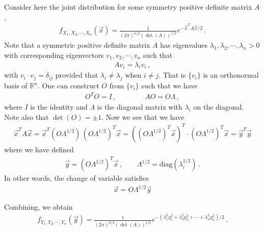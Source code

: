 \documentclass[11pt, onesided]{book}
\theoremstyle{break}
\theoremstyle{break}
\newcommand{\R}{\mathbb{R}}
\begin{document}
Consider here the joint distribution for some symmetry positive definite matrix $A$,
\begin{align*}
f_{X_1,X_2,\cdots, X_n}(\vec{x}) = \frac{1}{(2\pi)^{n/2} (\det(A))^{1/2}} e^{-\vec{x}^T A\vec{x}/2}\,.
\end{align*}
Note that a symmetric positive definite matrix $A$ has eigenvalues $\lambda_1,\lambda_2,\cdots, \lambda_n > 0$ with corresponding eigenvectors $v_1,v_2,\cdots, v_n$ such that 
\begin{align*}
A v_i = \lambda_i v_i\,,
\end{align*}
with $v_i \cdot v_j = \delta_{ij}$ provided that $\lambda_i \neq \lambda_j$ when $i \neq j$. That is $\{v_i\}$ is an orthonormal basis of $\R^n$. One can construct $O$ from $\{v_i\}$ such that we have
\begin{align*}
O^TO = I\,,\qquad \qquad AO = O\Lambda\,,
\end{align*}
where $I$ is the identity and $\Lambda$ is the diagonal matrix with $\lambda_i$ on the diagonal. Note also that $\det(O) = \pm 1$. Now we see that we have
\begin{align*}
\vec{x}^T A \vec{x} = \vec{x}^T\left( O \Lambda^{1/2}\right)\, \left( O \Lambda^{1/2}\right)^T \vec{x} = \left( (O \Lambda^{1/2})^T \vec{x}\right)^T \cdot \left( O \Lambda^{1/2}\right)^T \vec{x} = \vec{y}^T \vec{y}
\end{align*}
where we have defined
\begin{align*}
\vec{y} = \left( O \Lambda^{1/2}\right)^T \vec{x}\,,\qquad \Lambda^{1/2} = \text{diag}(\lambda_i^{1/2})\,.
\end{align*}
In other words, the change of variable satisfies
\begin{align*}
\vec{x} = O\Lambda^{1/2} \vec{y}
\end{align*}

Combining, we obtain
\begin{align*}
f_{Y_1,Y_2,\cdots,Y_n}(\vec{y}) = \frac{1}{(2\pi)^{n/2} (\det(A))^{1/2}}e^{-(\lambda_1^2 y_1^2+\lambda_2^2 y_2^2 + \cdots + \lambda_n^2 y_n^2)/2}\,.
\end{align*}
\end{document}
